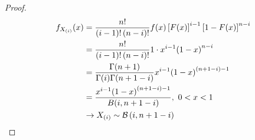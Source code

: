 \documentclass[openany,12pt]{book}
\begin{document}
\begin{proof}
\[\begin{aligned}
f_{X_{\left( i \right)}}(x) &= \frac{n!}{\left( i - 1 \right)!\left( n - i \right)!}f(x)\left[ F(x) \right]^{i - 1}\left[ 1 - F(x) \right]^{n - i}\\
&= \frac{n!}{\left( i - 1 \right)!\left( n - i \right)!}1 \cdot x^{i - 1}{(1 - x)}^{n - i}\\
&= \frac{\Gamma(n + 1)}{\Gamma(i)\Gamma(n + 1 - i)}x^{i - 1}{(1 - x)}^{(n + 1 - i) - 1}\\
&= \frac{x^{i - 1}{(1 - x)}^{(n + 1 - i) - 1}}{B(i,n + 1 - i)},\ 0 < x < 1\\
&\to X_{(i)}\sim\mathcal{B}\left( i,n + 1 - i \right)
\end{aligned}\]
\end{proof}
\end{document}
